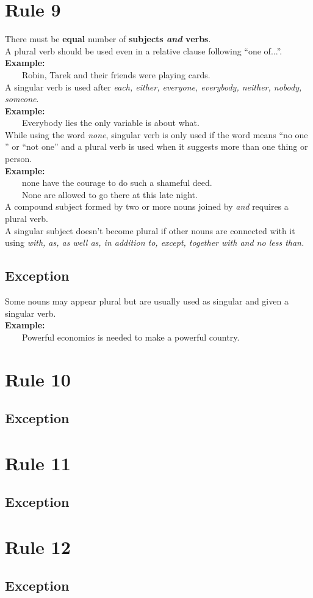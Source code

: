 \documentclass{report}
\newcommand{\xmpl}{\textbf{Example:}\\} %
\newcommand{\indnt}{\ \ \ \ } %
\begin{document}
\section{Rule 9}
There must be \textbf{equal} number of \textbf{subjects \emph{and} verbs}.\\ 
A plural verb should be used even in a relative clause following ``one of...''.\\
\xmpl
\indnt Robin, Tarek and their friends were playing cards.\\
A singular verb is used after \emph{each, either, everyone, everybody, neither, nobody, someone}.\\
\xmpl
\indnt Everybody lies the only variable is about what.\\
While using the word \emph{none}, singular verb is only used if the word means ``no one '' or ``not one'' and a plural verb is used when it suggests more than one thing or person.\\
\xmpl
\indnt none have the courage to do such a shameful deed.\\
\indnt None are allowed to go there at this late night.\\
A compound subject formed by two or more nouns joined by \emph{and} requires a plural verb.\\
A singular subject doesn't become plural if other nouns are connected with it using \emph{with, as, as well as, in addition to, except, together with \emph{and} no less than.}
\subsection{Exception}
Some nouns may appear plural but are usually used as singular and given a singular verb.\\
\textbf{Example:}\\
\indnt Powerful economics is needed to make a powerful country.

\section{Rule 10}
\subsection{Exception}

\section{Rule 11}
\subsection{Exception}

\section{Rule 12}
\subsection{Exception}
\end{document}
